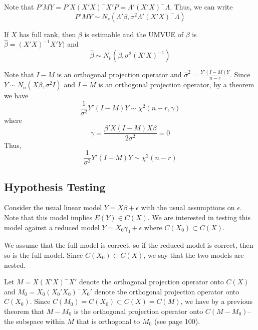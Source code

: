 \documentclass[12pt]{article}
\newcommand{\bhat}{\hat{\beta}}
\numberwithin{equation}{section}
\begin{document}
Note that $P'MY = P'X(X'X)^{-} X'P = \Lambda'(X'X)^{-} \Lambda$. Thus, we can write
\begin{equation*}
  P'MY \sim N_s(\Lambda'\beta, \sigma^2 \Lambda'(X'X)^{-} \Lambda)
\end{equation*}

If $X$ has full rank, then $\beta$ is estimable and the UMVUE of $\beta$ is $\bhat = (X'X)^{-1} X'Y)$ and 
\begin{equation*}
  \bhat \sim N_p(\beta, \sigma^2 (X'X)^{-1})
\end{equation*}

Note that $I - M$ is an orthogonal projection operator and $\hat{\sigma}^2 = \frac{Y'(I - M)Y}{n-r}$. Since $Y \sim N_n(X\beta, \sigma^2 I)$ and $I - M$ is an orthogonal projection operator, by a theorem we have
\begin{equation*}
  \frac{1}{\sigma^2} Y'(I - M) Y \sim \chi^2(n - r, \gamma)
\end{equation*}
where 
\begin{equation*}
  \gamma = \frac{\beta'X(I - M)X\beta}{2\sigma^2} = 0
\end{equation*}
Thus,
\begin{equation*}
  \frac{1}{\sigma^2} Y'(I - M)Y \sim \chi^2(n - r)
\end{equation*}

\subsection{Hypothesis Testing}
Consider the usual linear model $Y = X\beta + \epsilon$ with the usual assumptions on $\epsilon$. Note that this model implies $E(Y) \in C(X)$. We are interested in testing this model against a reduced model $Y = X_0 \gamma_0 + \epsilon$ where $C(X_0) \subset C(X)$.

We assume that the full model is correct, so if the reduced model is correct, then so is the full model. Since $C(X_0) \subset C(X)$, we say that the two models are nested.

Let $M = X(X'X)^{-}X'$ denote the orthogonal projection operator onto $C(X)$ and $M_0 = X_0 (X_0' X_0)^{-} X_0'$ denote the orthogonal projection operator onto $C(X_0)$. Since $C(M_0) = C(X_0) \subset C(X) = C(M)$, we have by a previous theorem that $M - M_0$ is the orthogonal projection operator onto $C(M - M_0)$--the subspace within $M$ that is orthogonal to $M_0$ (see page 100).
\end{document}

